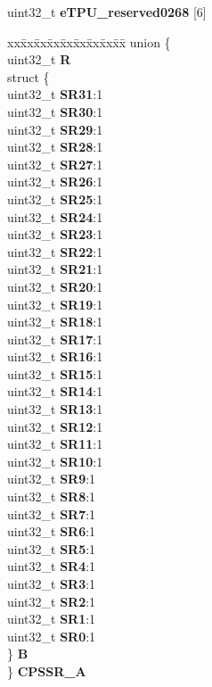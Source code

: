 \begin{DoxyCompactItemize}
\begin{tabbing}
\end{tabbing}\item 
\mbox{\label{structETPU__tag_a111004c00e428cfa77954768c9a68c04}} 
uint32\+\_\+t {\bfseries e\+T\+P\+U\+\_\+reserved0268} \mbox{[}6\mbox{]}
\item 
\mbox{\label{structETPU__tag_a6caddf4703757c051ef81c90eb11247d}} 
\begin{tabbing}
xx\=xx\=xx\=xx\=xx\=xx\=xx\=xx\=xx\=\kill
union \{\\
\>uint32\_t {\bfseries R}\\
\>struct \{\\
\>\>uint32\_t {\bfseries SR31}:1\\
\>\>uint32\_t {\bfseries SR30}:1\\
\>\>uint32\_t {\bfseries SR29}:1\\
\>\>uint32\_t {\bfseries SR28}:1\\
\>\>uint32\_t {\bfseries SR27}:1\\
\>\>uint32\_t {\bfseries SR26}:1\\
\>\>uint32\_t {\bfseries SR25}:1\\
\>\>uint32\_t {\bfseries SR24}:1\\
\>\>uint32\_t {\bfseries SR23}:1\\
\>\>uint32\_t {\bfseries SR22}:1\\
\>\>uint32\_t {\bfseries SR21}:1\\
\>\>uint32\_t {\bfseries SR20}:1\\
\>\>uint32\_t {\bfseries SR19}:1\\
\>\>uint32\_t {\bfseries SR18}:1\\
\>\>uint32\_t {\bfseries SR17}:1\\
\>\>uint32\_t {\bfseries SR16}:1\\
\>\>uint32\_t {\bfseries SR15}:1\\
\>\>uint32\_t {\bfseries SR14}:1\\
\>\>uint32\_t {\bfseries SR13}:1\\
\>\>uint32\_t {\bfseries SR12}:1\\
\>\>uint32\_t {\bfseries SR11}:1\\
\>\>uint32\_t {\bfseries SR10}:1\\
\>\>uint32\_t {\bfseries SR9}:1\\
\>\>uint32\_t {\bfseries SR8}:1\\
\>\>uint32\_t {\bfseries SR7}:1\\
\>\>uint32\_t {\bfseries SR6}:1\\
\>\>uint32\_t {\bfseries SR5}:1\\
\>\>uint32\_t {\bfseries SR4}:1\\
\>\>uint32\_t {\bfseries SR3}:1\\
\>\>uint32\_t {\bfseries SR2}:1\\
\>\>uint32\_t {\bfseries SR1}:1\\
\>\>uint32\_t {\bfseries SR0}:1\\
\>\} {\bfseries B}\\
\} {\bfseries CPSSR\_A}\\


\end{tabbing}
\end{DoxyCompactItemize}
